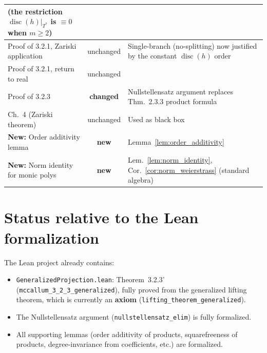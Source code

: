 \documentclass[11pt]{article}
\theoremstyle{plain}
\theoremstyle{definition}
\DeclareMathOperator{\disc}{disc}
\begin{document}
\begin{center}
\begin{tabular}{|l|c|p{7cm}|}
  (the restriction $\disc(h)|_{T^*}$ is $\equiv 0$ when $m \ge 2$) \\
\hline
Proof of 3.2.1, Zariski application & unchanged & Single-branch
  (no-splitting) now justified by the constant $\disc(h)$ order \\
\hline
Proof of 3.2.1, return to real & unchanged & \\
\hline
Proof of 3.2.3 & \textbf{changed} & Nullstellensatz argument replaces
  Thm.~2.3.3 product formula \\
\hline
Ch.~4 (Zariski theorem) & unchanged & Used as black box \\
\hline
\textbf{New:} Order additivity lemma & \textbf{new} &
  Lemma~\ref{lem:order_additivity} \\
\hline
\textbf{New:} Norm identity for monic polys & \textbf{new} &
  Lem.~\ref{lem:norm_identity}, Cor.~\ref{cor:norm_weierstrass}
  (standard algebra) \\
\hline
\end{tabular}
\end{center}

\section{Status relative to the Lean formalization}
\label{sec:lean_status}

The Lean project already contains:
\begin{itemize}
\item \texttt{GeneralizedProjection.lean}: Theorem~3.2.3'
  (\texttt{mccallum\_3\_2\_3\_generalized}), fully proved from the
  generalized lifting theorem, which is currently an \textbf{axiom}
  (\texttt{lifting\_theorem\_generalized}).
\item The Nullstellensatz argument
  (\texttt{nullstellensatz\_elim}) is fully formalized.
\item All supporting lemmas (order additivity of products, squarefreeness
  of products, degree-invariance from coefficients, etc.) are formalized.
\end{itemize}
\end{document}
